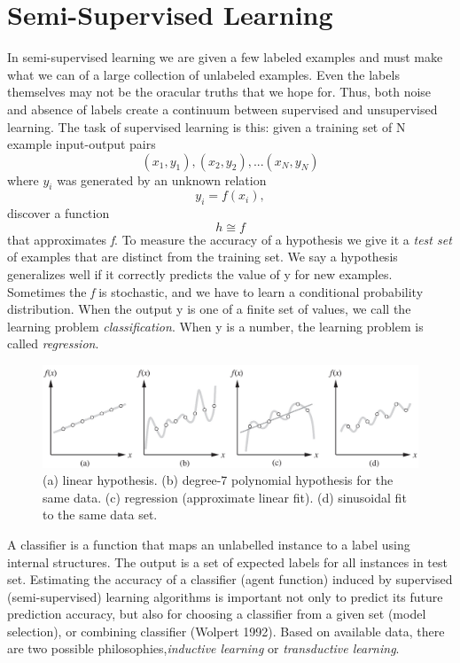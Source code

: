\documentclass{report}
\begin{document}
\section{Semi-Supervised Learning}
In semi-supervised learning we are given a few labeled examples and must make what we can of a large collection of unlabeled examples. Even the labels themselves may not be the oracular truths that we hope for. Thus, both noise and absence of labels create a continuum between supervised and unsupervised learning.
The task of supervised learning is this: 
given a training set of N example input-output pairs
\[(x_1,y_1), (x_2,y_2),...(x_N,y_N)\] where $y_i$ was generated by an unknown relation \[y_i = f(x_i),\] discover a function \[h\cong f\] that approximates \textit{f}.
To measure the accuracy of a hypothesis we give it a \textit{test set} of examples that are distinct from the training set. We say a hypothesis generalizes well if it correctly predicts the value of y for new examples. Sometimes the \textit{f} is stochastic, and we have to learn a conditional probability distribution.
When the output y is one of a finite set of values, we call the learning problem \textit{classification}. When y is a number, the learning problem is called \textit{regression}.

\begin{figure}[htbp]
\centering
\includegraphics[scale=0.2]{function.jpg}
\caption{(a) linear hypothesis. (b) degree-7 polynomial hypothesis for the same data. (c) regression (approximate linear fit). (d) sinusoidal fit to the same data set.
\label{fig:mission}}
\end{figure}

A classifier is a function that maps an unlabelled instance to a label using internal structures. The output is a set of expected labels for all instances in test set.
Estimating the accuracy of a classifier (agent function) induced by supervised (semi-supervised) learning algorithms is important not only to predict its future prediction accuracy, but also for choosing a classifier from a given set (model selection), or combining classifier (Wolpert 1992).
Based on available data, there are two possible philosophies,\textit{inductive learning} or \textit{transductive learning}.
\end{document}
